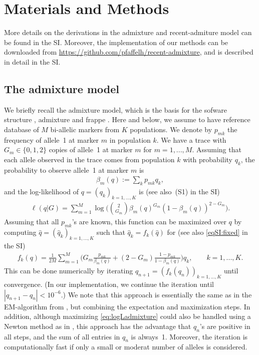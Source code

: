\documentclass[12pt]{article}
\theoremstyle{definition}
\begin{document}
\section{Materials and Methods}
\sloppy More details on the derivations in the admixture and
recent-admiture model can be found in the SI. Moreover, the
implementation of our methods can be downloaded from \url{
  https://github.com/pfaffelh/recent-admixture}, and is described in
detail in the SI.

\subsection{The admixture model}
We briefly recall the admixture model, which is the basis for the
sofware {\sc structure} \cite{Pritchard2000}, {\sc admixture}
\cite{Alexander2009} and {\sc frappe} \cite{Tang2005}.  Here and
below, we assume to have reference database of $M$ bi-allelic markers
from $K$ populations. We denote by $p_{mk}$ the frequency of allele~1
at marker $m$ in population $k$. We have a trace with
$G_m \in \{0,1,2\}$ copies of allele~1 at marker $m$ for
$m=1,...,M$. Assuming that each allele observed in the trace comes
from population $k$ with probability $q_k$, the probability to observe
allele~1 at marker $m$ is
\begin{align}
  \label{eq:beta}
  \beta_m(q) := \sum_k p_{mk} q_k,  
\end{align}
and the log-likelihood of $q = (q_k)_{k=1,...,K}$ is (see also~(S1) in
the SI)
\begin{align}\label{eq:logLadmixture}
  \ell(q|G) = \sum_{m=1}^M \log\Big(\binom{2}{G_m} \beta_m(q)^{G_m}(1-\beta_m(q))^{2-G_m}\Big).
\end{align}
Assuming that all $p_{mk}$'s are known, this function can be maximized
over $q$ by computing $\hat q = (\hat q_k)_{k=1,...,K}$ such that
$\hat q_k = f_k(\hat q)$ for (see also \eqref{eqSI:fixed} in the SI)
\begin{align}\label{eq:fixed}
  f_k(q) =
  \frac{1}{2M} \sum_{m=1}^M \Big(G_m \frac{p_{mk}}{\beta_m(q)} + (2-G_m)\frac{1-p_{mk}}{1-\beta_m(q)}\Big)q_k,
  \qquad k =1,...,K.
\end{align}
This can be done numerically by iterating
$q_{n+1} = (f_k(q_n))_{k=1,...,K}$ until convergence. (In our
implementation, we continue the iteration until
$|q_{n+1} - q_n|< 10^{-6}$.) We note that this approach is essentially
the same as in the EM-algorithm from \cite{Tang2005}, but combining
the expectation and maximization steps. In addition, although
maximizing \eqref{eq:logLadmixture} could also be handled using a
Newton method as in \cite{Alexander2006}, this approach has the
advantage that $q_n$'s are positive in all steps, and the sum of all
entries in $q_n$ is always~1. Moreover, the iteration is
computationally fast if only a small or moderat number of alleles is
considered.
\end{document}
